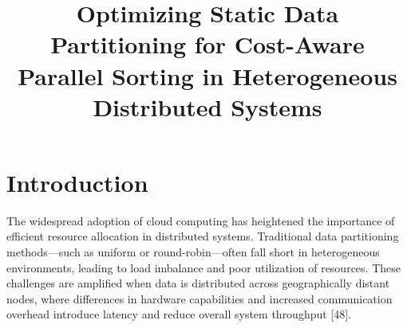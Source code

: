 \documentclass[]{interact}
\theoremstyle{plain}
\theoremstyle{definition}
\theoremstyle{remark}
\begin{document}

\title{Optimizing Static Data Partitioning for Cost-Aware Parallel Sorting in Heterogeneous Distributed Systems}

\author{
}

\maketitle


\section{Introduction}
The widespread adoption of cloud computing has heightened the importance of efficient resource allocation in distributed systems. Traditional data partitioning methods—such as uniform or round-robin—often fall short in heterogeneous environments, leading to load imbalance and poor utilization of resources. These challenges are amplified when data is distributed across geographically distant nodes, where differences in hardware capabilities and increased communication overhead introduce latency and reduce overall system throughput [48].
\end{document}
